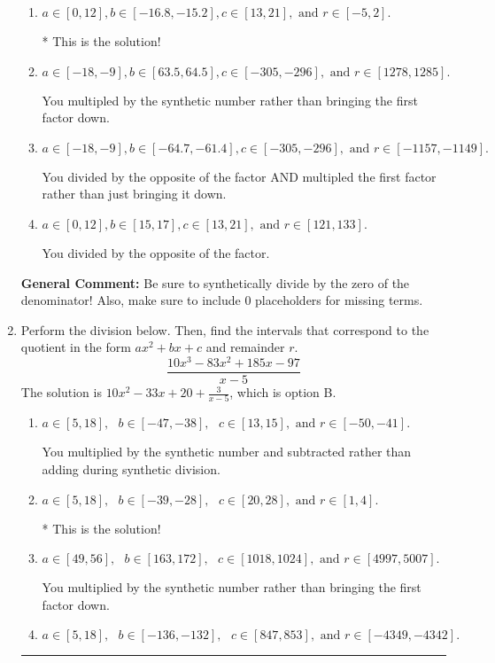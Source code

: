 \documentclass{extbook}[14pt]
\newcommand{\litem}[1]{\item #1

\rule{\textwidth}{0.4pt}}
\begin{document}
\begin{enumerate}
{\begin{enumerate}[label=\Alph*.]
 You multipled by the synthetic number and subtracted rather than adding during synthetic division.
\item \( a \in [0, 12], b \in [-16.8, -15.2], c \in [13, 21], \text{ and } r \in [-5, 2]. \)

* This is the solution!
\item \( a \in [-18, -9], b \in [63.5, 64.5], c \in [-305, -296], \text{ and } r \in [1278, 1285]. \)

 You multipled by the synthetic number rather than bringing the first factor down.
\item \( a \in [-18, -9], b \in [-64.7, -61.4], c \in [-305, -296], \text{ and } r \in [-1157, -1149]. \)

 You divided by the opposite of the factor AND multipled the first factor rather than just bringing it down.
\item \( a \in [0, 12], b \in [15, 17], c \in [13, 21], \text{ and } r \in [121, 133]. \)

 You divided by the opposite of the factor.
\end{enumerate}

\textbf{General Comment:} Be sure to synthetically divide by the zero of the denominator! Also, make sure to include 0 placeholders for missing terms.
}
\litem{
Perform the division below. Then, find the intervals that correspond to the quotient in the form $ax^2+bx+c$ and remainder $r$.
\[ \frac{10x^{3} -83 x^{2} +185 x -97}{x -5} \]The solution is \( 10x^{2} -33 x + 20 + \frac{3}{x -5} \), which is option B.\begin{enumerate}[label=\Alph*.]
\item \( a \in [5, 18], \text{   } b \in [-47, -38], \text{   } c \in [13, 15], \text{   and   } r \in [-50, -41]. \)

 You multiplied by the synthetic number and subtracted rather than adding during synthetic division.
\item \( a \in [5, 18], \text{   } b \in [-39, -28], \text{   } c \in [20, 28], \text{   and   } r \in [1, 4]. \)

* This is the solution!
\item \( a \in [49, 56], \text{   } b \in [163, 172], \text{   } c \in [1018, 1024], \text{   and   } r \in [4997, 5007]. \)

 You multiplied by the synthetic number rather than bringing the first factor down.
\item \( a \in [5, 18], \text{   } b \in [-136, -132], \text{   } c \in [847, 853], \text{   and   } r \in [-4349, -4342]. \)


\end{enumerate}}
\end{enumerate}
\end{document}
